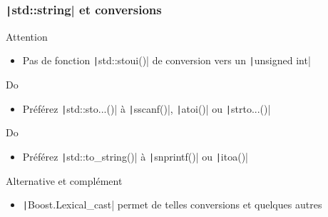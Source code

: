 \documentclass[C++.tex]{subfiles}
\begin{document}
\begin{frame}[fragile]
	\frametitle{\texttt|std::string| et conversions}
	\begin{alertblock}{Attention}
		\begin{itemize}
			\item Pas de fonction \texttt|std::stoui()| de conversion vers un \texttt|unsigned int|
		\end{itemize}
	\end{alertblock}

	\begin{exampleblock}{Do}
		\begin{itemize}
			\item Préférez \texttt|std::sto...()| à \texttt|sscanf()|, \texttt|atoi()| ou \texttt|strto...()|
		\end{itemize}
	\end{exampleblock}

	\begin{exampleblock}{Do}
		\begin{itemize}
			\item Préférez \texttt|std::to_string()| à \texttt|snprintf()| ou \texttt|itoa()|
		\end{itemize}
	\end{exampleblock}

	\begin{block}{Alternative et complément}
		\begin{itemize}
			\item \texttt|Boost.Lexical_cast| permet de telles conversions et quelques autres
		\end{itemize}
	\end{block}
\end{frame}
\end{document}
